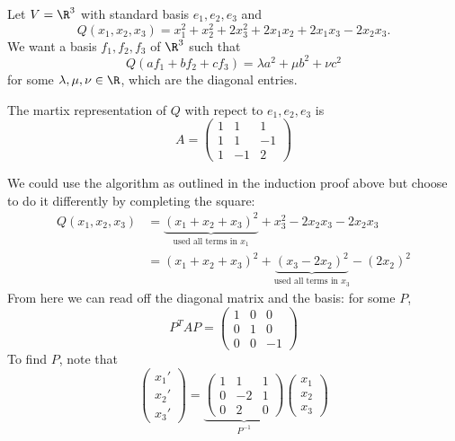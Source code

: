 \documentclass[a4paper]{article}
\theoremstyle{definition}
\begin{document}
\begin{eg}
  Let \(V = \R^3\) with standard basis \(e_1, e_2, e_3\) and
  \[
    Q(x_1, x_2, x_3) = x_1^2 + x_2^2 + 2x_3^2 + 2x_1x_2 + 2x_1x_3 -2x_2x_3.
  \]
  We want a basis \(f_1, f_2, f_3\) of \(\R^3\) such that
  \[
    Q(af_1 + bf_2 + cf_3) = \lambda a^2 + \mu b^2 + \nu c^2
  \]
  for some \(\lambda, \mu, \nu \in \R\), which are the diagonal entries.

  The martix representation of \(Q\) with repect to \(e_1, e_2, e_3\) is
  \[
    A =
    \begin{pmatrix}
      1 & 1 & 1 \\
      1 & 1 & -1 \\
      1 & -1 & 2
    \end{pmatrix}
  \]

  We could use the algorithm as outlined in the induction proof above but choose to do it differently by completing the square:
    \begin{align*}
      Q(x_1, x_2, x_3) &= \underbrace{(x_1 + x_2 + x_3)^2}_{\text{used all terms in } x_1} + x_3^2 - 2x_2x_3 - 2 x_2x_3 \\
                       &= (x_1 + x_2 + x_3)^2 + \underbrace{(x_3 - 2x_2)^2}_{\text{used all terms in } x_3} - (2x_2)^2
    \end{align*}
    From here we can read off the diagonal matrix and the basis: for some \(P\),
    \[
      P^TAP =
      \begin{pmatrix}
        1 & 0 & 0 \\
        0 & 1 & 0 \\
        0 & 0 & -1
      \end{pmatrix}
    \]
    To find \(P\), note that
    \[
      \begin{pmatrix}
        x_1' \\
        x_2' \\
        x_3'
      \end{pmatrix}
      =
      \underbrace{
      \begin{pmatrix}
        1 & 1 & 1 \\
        0 & -2 & 1 \\
        0 & 2 & 0 
      \end{pmatrix}
    }_{P^{-1}}
    \begin{pmatrix}
      x_1 \\
      x_2 \\
      x_3
    \end{pmatrix}
    \]
\end{eg}
\end{document}
